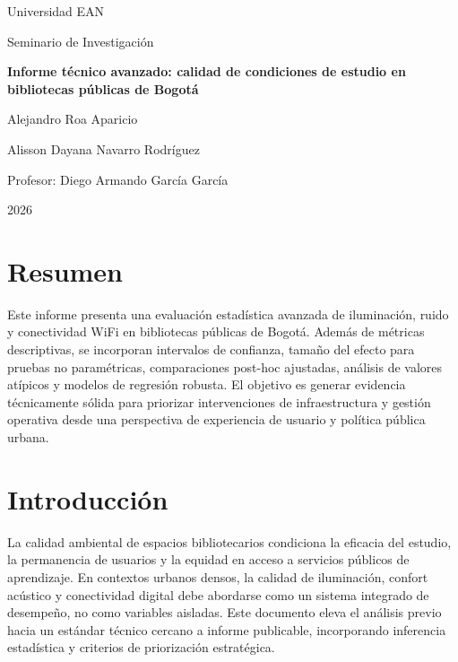 \documentclass[12pt,a4paper]{article}
\begin{document}
\begin{titlepage}
\centering
{\Large Universidad EAN\par}
\vspace{1.2cm}
{\large Seminario de Investigación\par}
\vspace{1.2cm}
{\Large\bfseries Informe técnico avanzado: calidad de condiciones de estudio en bibliotecas públicas de Bogotá\par}
\vspace{1.6cm}
{\large Alejandro Roa Aparicio\par}
{\large Alisson Dayana Navarro Rodríguez\par}
\vspace{1.2cm}
{\large Profesor: Diego Armando García García\par}
\vfill
{\large 2026\par}
\end{titlepage}

\setcounter{page}{1}

\section*{Resumen}
Este informe presenta una evaluación estadística avanzada de iluminación, ruido y conectividad WiFi en bibliotecas públicas de Bogotá. Además de métricas descriptivas, se incorporan intervalos de confianza, tamaño del efecto para pruebas no paramétricas, comparaciones post-hoc ajustadas, análisis de valores atípicos y modelos de regresión robusta. El objetivo es generar evidencia técnicamente sólida para priorizar intervenciones de infraestructura y gestión operativa desde una perspectiva de experiencia de usuario y política pública urbana.

\newpage
\tableofcontents
\newpage
\listoftables
\newpage
\listoffigures
\newpage

\setcounter{page}{1}

\section{Introducción}
La calidad ambiental de espacios bibliotecarios condiciona la eficacia del estudio, la permanencia de usuarios y la equidad en acceso a servicios públicos de aprendizaje. En contextos urbanos densos, la calidad de iluminación, confort acústico y conectividad digital debe abordarse como un sistema integrado de desempeño, no como variables aisladas. Este documento eleva el análisis previo hacia un estándar técnico cercano a informe publicable, incorporando inferencia estadística y criterios de priorización estratégica.
\end{document}
